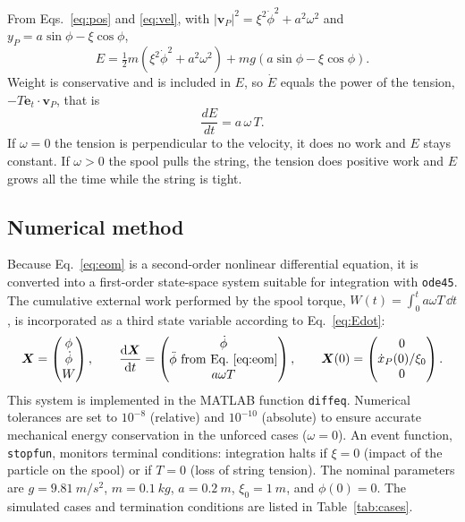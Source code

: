 \documentclass[11pt,a4paper]{article}
\newcommand{\dt}[1]{\dot{#1}}
\newcommand{\ddt}[1]{\ddot{#1}}
\newcommand{\et}{\bm{e}_t}
\begin{document}
From Eqs.~\eqref{eq:pos} and \eqref{eq:vel}, with $|\bm v_P|^2=\xi^2\dt\phi^2+a^2\omega^2$ and $y_P=a\sin\phi-\xi\cos\phi$,
\begin{equation}
E=\tfrac12 m\left(\xi^{2}\dt{\phi}^{2}+a^{2}\omega^{2}\right)+mg\left(a\sin\phi-\xi\cos\phi\right).
\label{eq:E}
\end{equation}
Weight is conservative and is included in $E$, so $\dt E$ equals the power of the tension, $-T\et\cdot\bm v_P$, that is
\begin{equation}
\frac{dE}{d t}=a\,\omega\,T .
\label{eq:Edot}
\end{equation}
If $\omega=0$ the tension is perpendicular to the velocity, it does no work and $E$ stays constant. If $\omega>0$ the spool pulls the string, the tension does positive work and $E$ grows all the time while the string is tight.
\subsection{Numerical method}
Because Eq.~\eqref{eq:eom} is a second-order nonlinear differential equation, it is converted into a first-order state-space system suitable for integration with \texttt{ode45}. The cumulative external work performed by the spool torque, $W(t)=\int_0^t a\omega T\,\dd t$, is incorporated as a third state variable according to Eq.~\eqref{eq:Edot}:
\begin{equation}
\bm X=\begin{pmatrix}\phi\\ \dt\phi\\ W\end{pmatrix},\qquad
\frac{\dd\bm X}{\dd t}=\begin{pmatrix}\dt\phi\\ \ddt\phi \text{ from Eq.~\eqref{eq:eom}}\\ a\omega T\end{pmatrix},\qquad
\bm X(0)=\begin{pmatrix}0\\ \dt x_P(0)/\xi_0\\ 0\end{pmatrix}.
\label{eq:system}
\end{equation}
This system is implemented in the MATLAB function \texttt{diffeq}. Numerical tolerances are set to $10^{-8}$ (relative) and $10^{-10}$ (absolute) to ensure accurate mechanical energy conservation in the unforced cases ($\omega=0$). An event function, \texttt{stopfun}, monitors terminal conditions: integration halts if $\xi=0$ (impact of the particle on the spool) or if $T=0$ (loss of string tension). The nominal parameters are $g=\SI{9.81}{m/s^2}$, $m=\SI{0.1}{kg}$, $a=\SI{0.2}{m}$, $\xi_0=\SI{1}{m}$, and $\phi(0)=0$. The simulated cases and termination conditions are listed in Table~\ref{tab:cases}.
\end{document}
